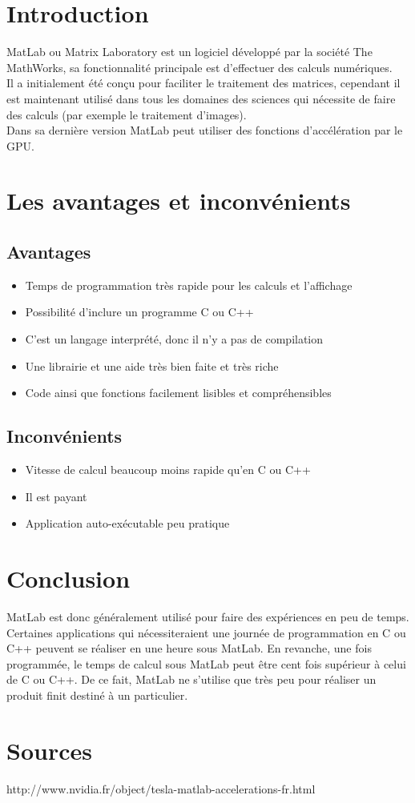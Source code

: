 \section{Introduction}
MatLab ou Matrix Laboratory est un logiciel développé par la société The MathWorks, sa fonctionnalité principale est d'effectuer des calculs numériques.\\ 
Il a initialement été conçu pour faciliter le traitement des matrices, cependant il est maintenant utilisé dans tous les domaines des sciences qui nécessite de faire des calculs (par exemple le traitement d'images).\\
Dans sa dernière version MatLab peut utiliser des fonctions d'accélération par le GPU.\\


\section{Les avantages et inconvénients}
\subsection{Avantages}
\begin{itemize}
\item Temps de programmation très rapide pour les calculs et l'affichage
\item Possibilité d'inclure un programme C ou C++
\item C'est un langage interprété, donc il n'y a pas de compilation
\item Une librairie et une aide très bien faite et très riche
\item Code ainsi que fonctions facilement lisibles et compréhensibles
\end{itemize}

\subsection{Inconvénients}
\begin{itemize}
\item Vitesse de calcul beaucoup moins rapide qu'en C ou C++
\item Il est payant
\item Application auto-exécutable peu pratique
\end{itemize}

\section{Conclusion}
MatLab est donc généralement utilisé pour faire des expériences en peu de temps. Certaines applications qui nécessiteraient une journée de programmation en C ou C++ peuvent se réaliser en une heure sous MatLab. En revanche, une fois programmée, le temps de calcul sous MatLab peut être cent fois supérieur à celui de C ou C++. De ce fait, MatLab ne s'utilise que très peu pour réaliser un produit finit destiné à un particulier. 

\section{Sources}
http://www.nvidia.fr/object/tesla-matlab-accelerations-fr.html
